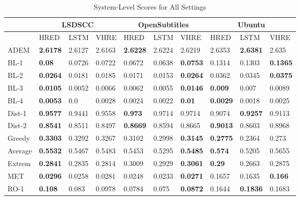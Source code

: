 \begin{table}%
    \centering%
    \caption{System-Level Scores for All Settings}%
    \small
    \label{tab:system_scores}%
    \setlength{\tabcolsep}{0.11cm}%
    \begin{tabular}{|l|l|l|l|l|l|l|l|l|l|}%
        \hline
        & \multicolumn{3}{c|}{LSDSCC} & \multicolumn{3}{c|}{OpenSubtitles} & \multicolumn{3}{c|}{Ubuntu}\\%
        \hline
        & HRED & LSTM & VHRE & HRED & LSTM & VHRE & HRED & LSTM & VHRE\\%
        \hline%
        ADEM & \textbf{2.6178} & 2.6127 & 2.6163 & \textbf{2.6228} & 2.6224 & 2.6219 & 2.6353 & \textbf{2.6381} & 2.635\\\hline
        BL{-}1 & \textbf{0.08} & 0.0726 & 0.0722 & 0.0672 & 0.0638 & \textbf{0.0753} & 0.1314 & 0.1303 & \textbf{0.1365}\\\hline
        BL{-}2 & \textbf{0.0264} & 0.0181 & 0.0185 & 0.0171 & 0.0153 & \textbf{0.0264} & 0.0362 & 0.0345 & \textbf{0.0375}\\\hline
        BL{-}3 & \textbf{0.0105} & 0.0052 & 0.0066 & 0.0062 & 0.0055 & \textbf{0.0146} & \textbf{0.009} & 0.007 & 0.0089\\\hline
        BL{-}4 & \textbf{0.0053} & 0.0 & 0.0028 & 0.0024 & 0.0022 & \textbf{0.01} & \textbf{0.0029} & 0.0018 & 0.0025\\\hline
        Dist{-}1 & \textbf{0.9577} & 0.9441 & 0.9558 & \textbf{0.973} & 0.9714 & 0.9714 & 0.9074 & \textbf{0.9257} & 0.9113\\\hline
        Dist{-}2 & \textbf{0.8541} & 0.8511 & 0.8497 & \textbf{0.8669} & 0.8594 & 0.8665 & \textbf{0.9013} & 0.8603 & 0.8968\\\hline
        Greedy & \textbf{0.3303} & 0.3292 & 0.3267 & 0.3102 & 0.2998 & \textbf{0.3145} & \textbf{0.2775} & 0.2364 & 0.273\\\hline
        Average & \textbf{0.5532} & 0.5467 & 0.5483 & 0.5453 & 0.5295 & \textbf{0.5485} & \textbf{0.574} & 0.5205 & 0.5655\\\hline
        Extrem & \textbf{0.2841} & 0.2835 & 0.2814 & 0.3009 & 0.2929 & \textbf{0.3061} & \textbf{0.29} & 0.2663 & 0.2875\\\hline
        MET & \textbf{0.0296} & 0.0258 & 0.0281 & 0.0248 & 0.0233 & \textbf{0.0271} & 0.1657 & 0.1635 & \textbf{0.166}\\\hline
        RO{-}1 & \textbf{0.108} & 0.083 & 0.0978 & 0.0784 & 0.075 & \textbf{0.0872} & 0.1644 & \textbf{0.1836} & 0.1683\\\hline

\end{tabular}
\end{table}
